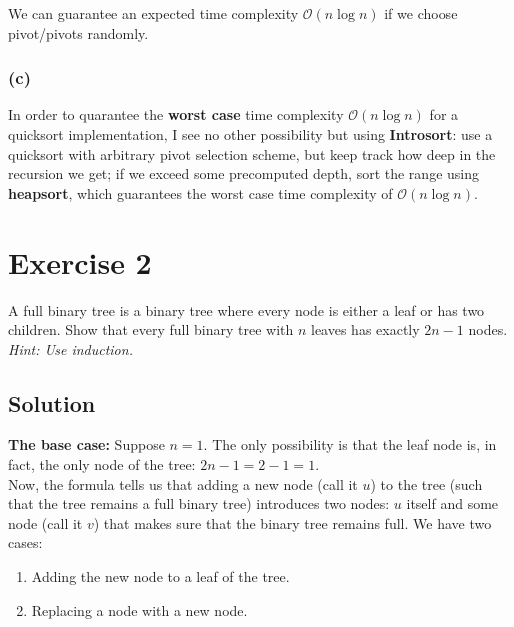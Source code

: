 \documentclass[10pt]{article}
\begin{document}
We can guarantee an expected time complexity $\mathcal{O}(n \log n)$ if we choose pivot/pivots randomly.

\subsubsection*{(c)} In order to quarantee the \textbf{worst case} time complexity $\mathcal{O}(n \log n)$ for a quicksort implementation, I see no other possibility but using \textbf{Introsort}: use a quicksort with arbitrary pivot selection scheme, but keep track how deep in the recursion we get; if we exceed some precomputed depth, sort the range using \textbf{heapsort}, which guarantees the worst case time complexity of $\mathcal{O}(n \log n)$.

\section*{Exercise 2}
\color{blue} A full binary tree is a binary tree where every node is either a leaf or has two children. Show that every full binary tree with $n$ leaves has exactly $2n - 1$ nodes. \textit{Hint: Use induction.}
\color{black}

\subsection*{Solution}
\textbf{The base case:} Suppose $n = 1$. The only possibility is that the leaf node is, in fact, the only node of the tree: $2n - 1 = 2 - 1 = 1$. \\
Now, the formula tells us that adding a new node (call it $u$) to the tree (such that the tree remains a full binary tree) introduces two nodes: $u$ itself and some node (call it $v$) that makes sure that the binary tree remains full. We have two cases:
\begin{enumerate}[label=(\Roman*)]
\item Adding the new node to a leaf of the tree.
\item Replacing a node with a new node.
\end{enumerate}
\end{document}
